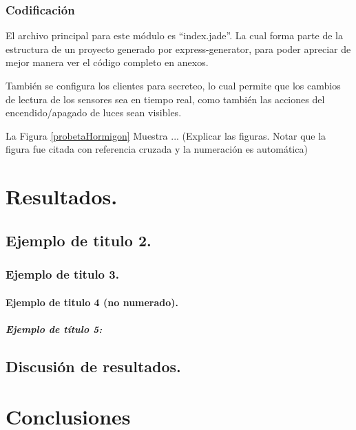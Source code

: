 \documentclass[11pt,letterpaper]{report}
\begin{document}
	\subsection{Codificación}
	El archivo principal para este módulo es “index.jade”. La  cual forma parte de la estructura de un proyecto generado por express-generator, para poder apreciar  de mejor manera  ver el código completo en anexos. 
	
También se configura los clientes para secreteo, lo cual permite que los cambios de lectura  de los sensores sea en tiempo real, como también las acciones del encendido/apagado de luces sean visibles.


	La Figura \ref{probetaHormigon} Muestra ... (Explicar las figuras. Notar que la figura fue
	citada con referencia cruzada y la numeración es automática) 
	


\chapter{Resultados.} 

	
	\section{Ejemplo de titulo 2.}
		
		\subsection{Ejemplo de titulo 3.}
			
			\subsubsection{Ejemplo de titulo 4 (no numerado).}

				\paragraph{Ejemplo de título 5:}

								
	\section{Discusión de resultados.}


\chapter{Conclusiones}
\end{document}
